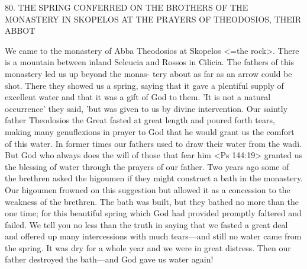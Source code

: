 80.
THE SPRING CONFERRED ON THE BROTHERS OF
THE MONASTERY IN SKOPELOS AT THE PRAYERS OF
THEODOSIOS, THEIR ABBOT

We came to the monastery of Abba Theodosios at Skopelos <=the
rock>.
There is a mountain between inland Seleucia and Rossos in
Cilicia.
The fathers of this monastery led us up beyond the monas-
tery about as far as an arrow could be shot.
There they showed us
a spring, saying that it gave a plentiful supply of excellent water and
that it was a gift of God to them.
'It is not a natural occurrence'
they said, 'but was given to us by divine intervention.
Our saintly
father Theodosios the Great fasted at great length and poured forth
tears, making many genuflexions in prayer to God that he would
grant us the comfort of this water.
In former times our fathers used
to draw their water from the wadi.
But God who always does the
will of those that fear him <Ps 144:19> granted us the blessing of
water through the prayers of our father.
Two years ago some of the
brethren asked the higoumen if they might construct a bath in the
monastery.
Our higoumen frowned on this suggestion but allowed
it as a concession to the weakness of the brethren.
The bath was
built, but they bathed no more than the one time; for this beautiful
spring which God had provided promptly faltered and failed.
We
tell you no less than the truth in saying that we fasted a great deal
and offered up many intercessions with much tears—and still no
water came from the spring.
It was dry for a whole year and we
were in great distress.
Then our father destroyed the bath—and God
gave us water again!

